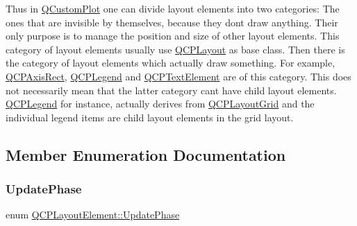 Thus in \hyperlink{class_q_custom_plot}{Q\+Custom\+Plot} one can divide layout elements into two categories\+: The ones that are invisible by themselves, because they don\textquotesingle{}t draw anything. Their only purpose is to manage the position and size of other layout elements. This category of layout elements usually use \hyperlink{class_q_c_p_layout}{Q\+C\+P\+Layout} as base class. Then there is the category of layout elements which actually draw something. For example, \hyperlink{class_q_c_p_axis_rect}{Q\+C\+P\+Axis\+Rect}, \hyperlink{class_q_c_p_legend}{Q\+C\+P\+Legend} and \hyperlink{class_q_c_p_text_element}{Q\+C\+P\+Text\+Element} are of this category. This does not necessarily mean that the latter category can\textquotesingle{}t have child layout elements. \hyperlink{class_q_c_p_legend}{Q\+C\+P\+Legend} for instance, actually derives from \hyperlink{class_q_c_p_layout_grid}{Q\+C\+P\+Layout\+Grid} and the individual legend items are child layout elements in the grid layout. 

\subsection{Member Enumeration Documentation}
\mbox{\label{class_q_c_p_layout_element_a0d83360e05735735aaf6d7983c56374d}} 
\subsubsection{\texorpdfstring{Update\+Phase}{UpdatePhase}\hspace{0.1cm}{\footnotesize\ttfamily [1/2]}}
{\footnotesize\ttfamily enum \hyperlink{class_q_c_p_layout_element_a0d83360e05735735aaf6d7983c56374d}{Q\+C\+P\+Layout\+Element\+::\+Update\+Phase}}

